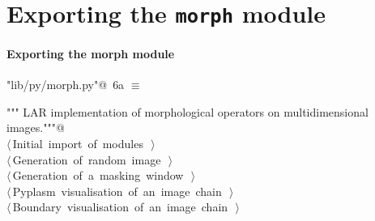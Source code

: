 \documentclass[11pt,oneside]{article}	%
\begin{document}
\section{Exporting the \texttt{morph} module}

\paragraph{Exporting the morph module}
\begin{flushleft} \small
\begin{minipage}{\linewidth} \label{scrap11}
\protect{}\verb@"lib/py/morph.py"@\nobreak\ {\footnotesize 6a }$\equiv$
\vspace{-1ex}
\begin{list}{}{} \item
\mbox{}\verb@""" LAR implementation of morphological operators on multidimensional images."""@\\
\mbox{}\verb@@\hbox{$\langle\,$Initial import of modules\nobreak\ {\footnotesize {}}$\,\rangle$}\verb@@\\
\mbox{}\verb@@\hbox{$\langle\,$Generation of random image\nobreak\ {\footnotesize {}}$\,\rangle$}\verb@@\\
\mbox{}\verb@@\hbox{$\langle\,$Generation of a masking window\nobreak\ {\footnotesize {}}$\,\rangle$}\verb@@\\
\mbox{}\verb@@\hbox{$\langle\,$Pyplasm visualisation of an image chain\nobreak\ {\footnotesize {}}$\,\rangle$}\verb@@\\
\mbox{}\verb@@\hbox{$\langle\,$Boundary visualisation of an image chain\nobreak\ {\footnotesize {}}$\,\rangle$}\verb@@\\
\mbox{}\verb@@{\NWsep}
\end{list}
\vspace{-2ex}
\end{minipage}\\[4ex]
\end{flushleft}
\end{document}

